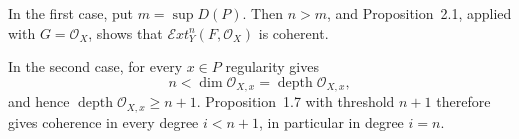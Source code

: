 \documentclass[11pt,a4paper]{article}
\newcommand{\OX}{\mathcal O_X}
\newcommand{\Oo}{\mathcal O}
\newcommand{\SheafExt}{\mathcal E\!xt}
\newcommand{\depthop}{\operatorname{depth}}
\begin{document}
In the first case, put $m=\sup D(P)$. Then $n>m$, and Proposition~2.1,
applied with $G=\OX$, shows that $\SheafExt_Y^n(F,\OX)$ is coherent.

In the second case, for every $x\in P$ regularity gives
\[
  n<\dim\Oo_{X,x}=\depthop\Oo_{X,x},
\]
and hence $\depthop\Oo_{X,x}\geq n+1$. Proposition~1.7 with threshold
$n+1$ therefore gives coherence in every degree $i<n+1$, in particular in
degree $i=n$.
\end{document}
